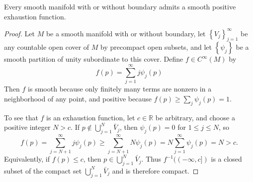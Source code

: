 \documentclass[12pt, oneside]{book}
\begin{document}
\begin{theorem}
    Every smooth manifold with or without boundary admits a smooth positive exhaustion function.
    \begin{proof}
        Let $M$ be a smooth manifold with or without boundary, let $\left\{V_j\right\}_{j=1}^{\infty}$ be any countable open cover of $M$ by precompact open subsets, and let $\left\{\psi_j\right\}$ be a smooth partition of unity subordinate to this cover. Define $f \in C^{\infty}(M)$ by
        \begin{equation*}
            f(p)=\sum_{j=1}^{\infty} j \psi_j(p)
        \end{equation*}
        Then $f$ is smooth because only finitely many terms are nonzero in a neighborhood of any point, and positive because $f(p) \geq \sum_j \psi_j(p)=1$.

        To see that $f$ is an exhaustion function, let $c \in \mathbb{R}$ be arbitrary, and choose a positive integer $N>c$. If $p \notin \bigcup_{j=1}^N \bar{V}_j$, then $\psi_j(p)=0$ for $1 \leq j \leq N$, so
        \begin{equation*}
            f(p)=\sum_{j=N+1}^{\infty} j \psi_j(p) \geq \sum_{j=N+1}^{\infty} N \psi_j(p)=N \sum_{j=1}^{\infty} \psi_j(p)=N>c .
        \end{equation*}
        Equivalently, if $f(p) \leq c$, then $p \in \bigcup_{j=1}^N \bar{V}_j$. Thus $f^{-1}((-\infty, c])$ is a closed subset of the compact set $\bigcup_{j=1}^N \bar{V}_j$ and is therefore compact.
    \end{proof}
\end{theorem}
\end{document}
